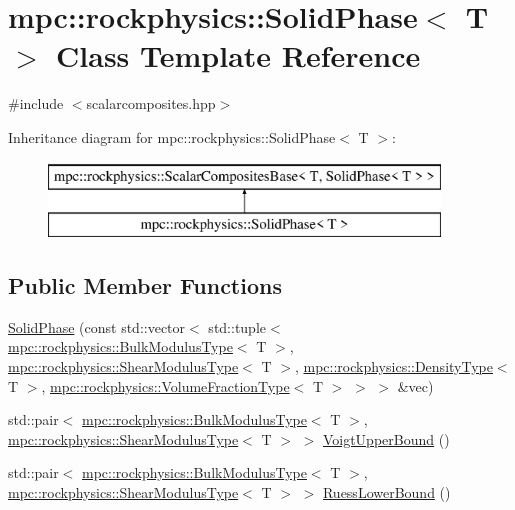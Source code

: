 \hypertarget{classmpc_1_1rockphysics_1_1_solid_phase}{}\section{mpc\+:\+:rockphysics\+:\+:Solid\+Phase$<$ T $>$ Class Template Reference}
\label{classmpc_1_1rockphysics_1_1_solid_phase}


{\ttfamily \#include $<$scalarcomposites.\+hpp$>$}

Inheritance diagram for mpc\+:\+:rockphysics\+:\+:Solid\+Phase$<$ T $>$\+:\begin{figure}[H]
\begin{center}
\leavevmode
\includegraphics[height=2.000000cm]{classmpc_1_1rockphysics_1_1_solid_phase}
\end{center}
\end{figure}
\subsection*{Public Member Functions}
\begin{DoxyCompactItemize}
\item 
\mbox{\hyperlink{classmpc_1_1rockphysics_1_1_solid_phase_ad44503640c956a6c89cb71678dacd6b1}{Solid\+Phase}} (const std\+::vector$<$ std\+::tuple$<$ \mbox{\hyperlink{structmpc_1_1rockphysics_1_1_bulk_modulus_type}{mpc\+::rockphysics\+::\+Bulk\+Modulus\+Type}}$<$ T $>$, \mbox{\hyperlink{structmpc_1_1rockphysics_1_1_shear_modulus_type}{mpc\+::rockphysics\+::\+Shear\+Modulus\+Type}}$<$ T $>$, \mbox{\hyperlink{structmpc_1_1rockphysics_1_1_density_type}{mpc\+::rockphysics\+::\+Density\+Type}}$<$ T $>$, \mbox{\hyperlink{structmpc_1_1rockphysics_1_1_volume_fraction_type}{mpc\+::rockphysics\+::\+Volume\+Fraction\+Type}}$<$ T $>$ $>$ $>$ \&vec)
\item 
std\+::pair$<$ \mbox{\hyperlink{structmpc_1_1rockphysics_1_1_bulk_modulus_type}{mpc\+::rockphysics\+::\+Bulk\+Modulus\+Type}}$<$ T $>$, \mbox{\hyperlink{structmpc_1_1rockphysics_1_1_shear_modulus_type}{mpc\+::rockphysics\+::\+Shear\+Modulus\+Type}}$<$ T $>$ $>$ \mbox{\hyperlink{classmpc_1_1rockphysics_1_1_solid_phase_abd8c8414863cabddc4e30fc8364a5aef}{Voigt\+Upper\+Bound}} ()
\item 
std\+::pair$<$ \mbox{\hyperlink{structmpc_1_1rockphysics_1_1_bulk_modulus_type}{mpc\+::rockphysics\+::\+Bulk\+Modulus\+Type}}$<$ T $>$, \mbox{\hyperlink{structmpc_1_1rockphysics_1_1_shear_modulus_type}{mpc\+::rockphysics\+::\+Shear\+Modulus\+Type}}$<$ T $>$ $>$ \mbox{\hyperlink{classmpc_1_1rockphysics_1_1_solid_phase_a3affb77f60c2967aa08833e703e0b932}{Ruess\+Lower\+Bound}} ()
\end{DoxyCompactItemize}
